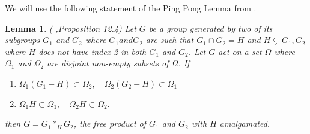 \documentclass[11pt]{amsart}
\theoremstyle{plain}
\newtheorem{lemma}[theorem]{Lemma}
\theoremstyle{remark}
\theoremstyle{definition}
\theoremstyle{remark}
\theoremstyle{named}
\begin{document}
We will use the following statement of the Ping Pong Lemma from \cite{schu}.
\begin{lemma} \label{pingpong}(\cite{schu} ,Proposition 12.4)
Let $G$ be a group generated by two of its subgroups $G_1$ and  $G_2$ where $G_1 and G_2$ are such that $G_1 \cap G_2 = H$ and $H \subsetneq G_1, G_2$ where $H$ does not have index 2 in both $G_1$ and $G_2$. Let $G$ act on a set $\Omega$ where $\Omega_1$ and $\Omega_2$ are disjoint non-empty subsets of $\Omega$. If
\begin{enumerate}
\item{$\Omega_1 (G_1-H) \subset \Omega_2, \quad \Omega_2 (G_2 - H) \subset \Omega_1$}
\item{$\Omega_1 H \subset \Omega_1, \quad \Omega_2 H \subset \Omega_2.$}
\end{enumerate}
then $G = G_1 *_H G_2$, the free product of $G_1$ and $G_2$ with $H$ amalgamated.
\end{lemma}
\end{document}
